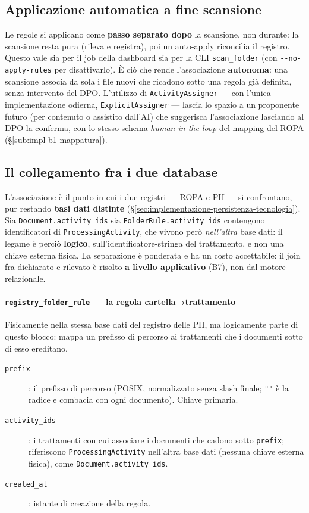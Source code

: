 \subsection{Applicazione automatica a fine scansione}
\label{sub:impl-b6-autoapply}

Le regole si applicano come \textbf{passo separato dopo} la scansione, non durante: la scansione resta pura (rileva e registra), poi un auto-apply riconcilia il registro. Questo vale sia per il job della dashboard sia per la CLI \texttt{scan\_folder} (con \texttt{-{}-no-apply-rules} per disattivarlo). È ciò che rende l'associazione \textbf{autonoma}: una scansione associa da sola i file nuovi che ricadono sotto una regola già definita, senza intervento del DPO. L'utilizzo di \texttt{ActivityAssigner} --- con l'unica implementazione odierna, \texttt{ExplicitAssigner} --- lascia lo spazio a un proponente futuro (per contenuto o assistito dall'AI) che suggerisca l'associazione lasciando al DPO la conferma, con lo stesso schema \emph{human-in-the-loop} del mapping del ROPA (§\ref{sub:impl-b1-mappatura}).

\subsection{Il collegamento fra i due database}
\label{sub:impl-b6-crossdb}

L'associazione è il punto in cui i due registri --- ROPA e PII --- si confrontano, pur restando \textbf{basi dati distinte} (§\ref{sec:implementazione-persistenza-tecnologia}). Sia \texttt{Document.activity\_ids} sia \texttt{FolderRule.activity\_ids} contengono identificatori di \texttt{ProcessingActivity}, che vivono però \emph{nell'altra} base dati: il legame è perciò \textbf{logico}, sull'identificatore-stringa del trattamento, e non una chiave esterna fisica. La separazione è ponderata e ha un costo accettabile: il join fra dichiarato e rilevato è risolto \textbf{a livello applicativo} (B7), non dal motore relazionale.

\paragraph*{\texttt{registry\_folder\_rule} --- la regola cartella→trattamento}
Fisicamente nella stessa base dati del registro delle PII, ma logicamente parte di questo blocco: mappa un prefisso di percorso ai trattamenti che i documenti sotto di esso ereditano.
\begin{description}
	\item[\texttt{prefix}]: il prefisso di percorso (POSIX, normalizzato senza slash finale; \texttt{""} è la radice e combacia con ogni documento). Chiave primaria.
	\item[\texttt{activity\_ids}]: i trattamenti con cui associare i documenti che cadono sotto \texttt{prefix}; riferiscono \texttt{ProcessingActivity} nell'altra base dati (nessuna chiave esterna fisica), come \texttt{Document.activity\_ids}.
	\item[\texttt{created\_at}]: istante di creazione della regola.
\end{description}


